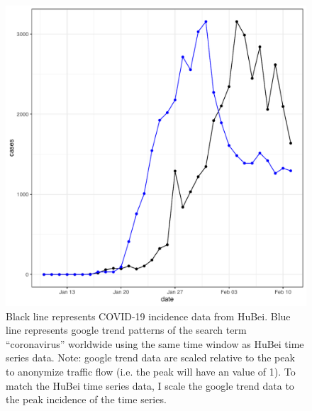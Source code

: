 \begin{center}
\begin{figure}[ht!]
\includegraphics[scale = 0.5]{./figures/gtplot.Rout.pdf}
\caption{Black line represents COVID-19 incidence data from HuBei. Blue line represents google trend patterns of the search term ``coronavirus'' worldwide using the same time window as HuBei time series data. Note: google trend data are scaled relative to the peak to anonymize traffic flow (i.e. the peak will have an value of 1). To match the HuBei time series data, I scale the google trend data to the peak incidence of the time series.}
\end{figure}
\end{center}


